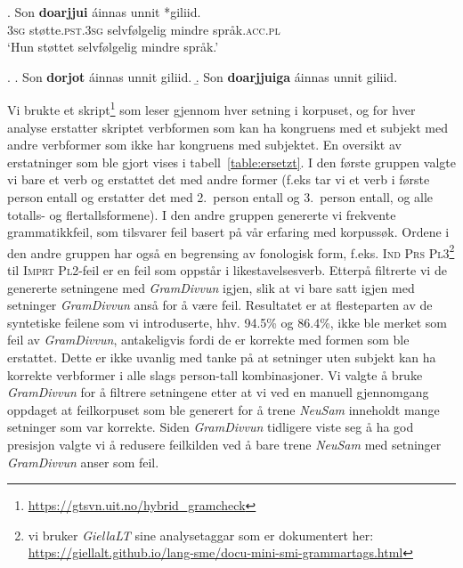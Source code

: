 \documentclass{flammie}
\begin{document}
\exg. Son \textbf{doarjjui} áinnas unnit *giliid.\label{doarjjui1}\\
\textsc{3sg} støtte\textsc{.pst.3sg} selvfølgelig mindre språk\textsc{.acc.pl}\\
`Hun støttet selvfølgelig mindre språk.'

\ex. \label{doarjjui2}
\a. Son \textbf{dorjot} áinnas unnit giliid.
\b. Son \textbf{doarjjuiga} áinnas unnit giliid.



Vi brukte et skript\footnote{\url{https://gtsvn.uit.no/hybrid_gramcheck}} som
leser gjennom hver setning i korpuset, og for hver analyse erstatter skriptet
verbformen som kan ha kongruens med et subjekt med andre verbformer som ikke har
kongruens med subjektet. En oversikt av erstatninger som ble gjort vises i
tabell~\ref{table:ersetzt}.  I den første gruppen valgte vi bare et verb og
erstattet det med andre former (f.eks tar vi et verb i første person entall og
erstatter det med 2.\ person entall og 3.\ person entall, og alle totalls- og
flertallsformene). I den andre gruppen genererte vi frekvente  grammatikkfeil,
som tilsvarer feil basert på vår erfaring med korpussøk.  Ordene i den andre
gruppen har også en begrensing av fonologisk form, f.eks. \textsc{Ind Prs
Pl3}\footnote{vi bruker \textit{GiellaLT} sine analysetaggar som er dokumentert
her: \url{https://giellalt.github.io/lang-sme/docu-mini-smi-grammartags.html}}
til \textsc{Imprt Pl2}-feil er en feil som oppstår i likestavelsesverb.  Etterpå
filtrerte vi de genererte setningene med \textit{GramDivvun} igjen, slik at vi
bare satt igjen med setninger \textit{GramDivvun} anså for å være feil.
Resultatet er at flesteparten av de syntetiske feilene som vi introduserte, hhv.
94.5\% og 86.4\%, ikke ble merket som feil av \textit{GramDivvun}, antakeligvis
fordi de er korrekte med formen som ble erstattet. Dette er ikke uvanlig med
tanke på at setninger uten subjekt kan ha korrekte verbformer i alle slags
person-tall kombinasjoner. Vi valgte å bruke \textit{GramDivvun} for å filtrere
setningene etter at vi ved en manuell gjennomgang oppdaget at feilkorpuset som
ble generert for å trene \textit{NeuSam} inneholdt mange setninger som var
korrekte. Siden \textit{GramDivvun} tidligere viste seg å ha god presisjon
valgte vi å redusere feilkilden ved å bare trene \textit{NeuSam} med setninger
\textit{GramDivvun} anser som feil.
\end{document}
